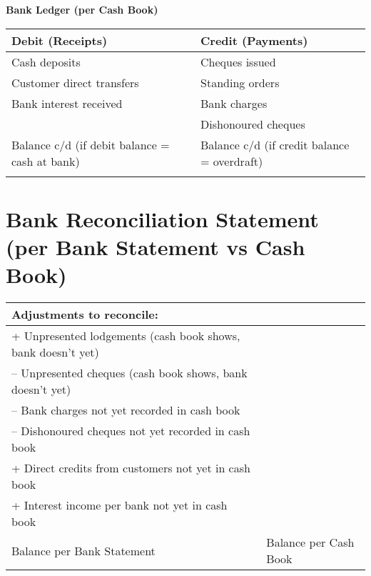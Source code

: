 \vspace{1cm}


\textbf{Bank Ledger (per Cash Book)}\\[3pt]
\begin{tabular}{@{}p{5cm}p{5cm}p{5cm}@{}}
\toprule
\textbf{Debit (Receipts)} & \textbf{} & \textbf{Credit (Payments)} \\
\midrule
Cash deposits & & Cheques issued \\
Customer direct transfers & & Standing orders \\
Bank interest received & & Bank charges \\
 & & Dishonoured cheques \\
Balance c/d (if debit balance = cash at bank) & & Balance c/d (if credit balance = overdraft) \\
\midrule
 & & \\
\bottomrule
\end{tabular}


\vspace{1cm}

\section*{Bank Reconciliation Statement (per Bank Statement vs Cash Book)}

\begin{tabular}{@{}p{6.5cm}p{6.5cm}@{}}
\toprule
\textbf{Adjustments to reconcile:} & \textbf{} \\
\midrule
+ Unpresented lodgements (cash book shows, bank doesn’t yet) &  \\
-- Unpresented cheques (cash book shows, bank doesn’t yet) & \\
-- Bank charges not yet recorded in cash book & \\
-- Dishonoured cheques not yet recorded in cash book & \\
+ Direct credits from customers not yet in cash book & \\
+ Interest income per bank not yet in cash book & \\
Balance per Bank Statement & Balance per Cash Book \\
\bottomrule
\end{tabular}

